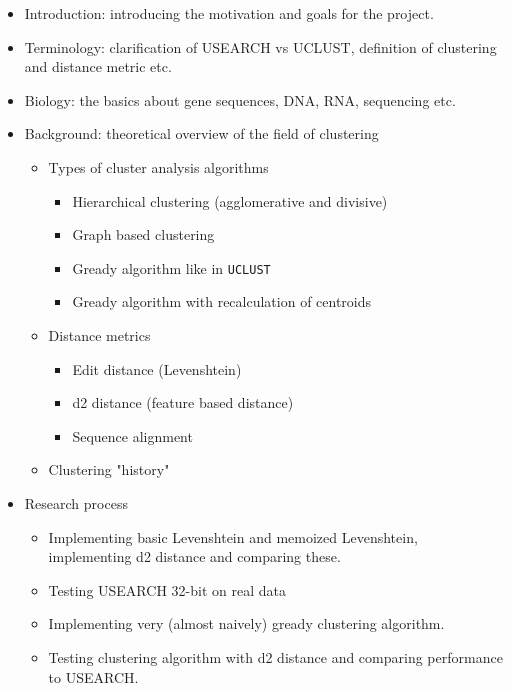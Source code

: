 \documentclass[11pt,a4paper]{article}
\begin{document}
\begin{itemize}
  \item Introduction: introducing the motivation and goals for the project.
    
  \item Terminology: clarification of USEARCH vs UCLUST, definition of
    clustering and distance metric etc.

  \item Biology: the basics about gene sequences, DNA, RNA, sequencing etc.

  \item Background: theoretical overview of the field of clustering
    \begin{itemize}
      \item Types of cluster analysis algorithms
        \begin{itemize}
          \item Hierarchical clustering (agglomerative and divisive)
          \item Graph based clustering
          \item Gready algorithm like in \texttt{UCLUST}
          \item Gready algorithm with recalculation of centroids
        \end{itemize}

      \item Distance metrics
        \begin{itemize}
          \item Edit distance (Levenshtein)
          \item d2 distance (feature based distance)
          \item Sequence alignment
        \end{itemize}

      \item Clustering "history"
    \end{itemize}

  \item Research process
    \begin{itemize}
      \item Implementing basic Levenshtein and memoized Levenshtein,
        implementing d2 distance and comparing these.
      \item Testing USEARCH 32-bit on real data
      \item Implementing very (almost naively) gready clustering algorithm.
      \item Testing clustering algorithm with d2 distance and comparing
        performance to USEARCH.
    \end{itemize}
\end{itemize}
\end{document}
